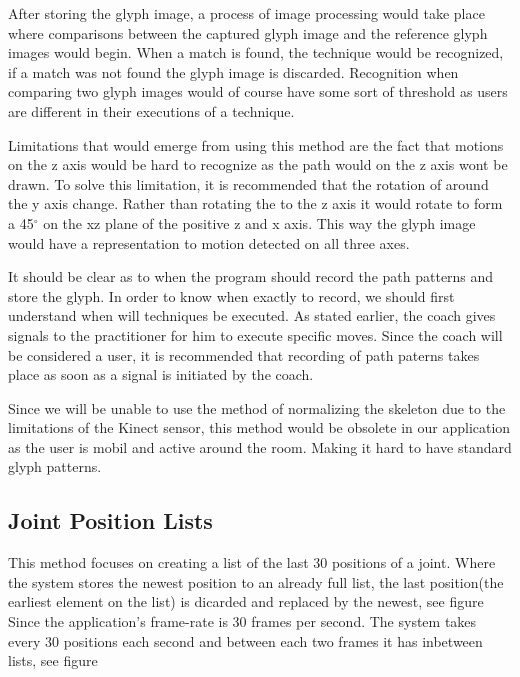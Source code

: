 
After storing the glyph image, a process of image processing would take place where comparisons between the captured glyph image and the reference glyph images would begin. When a match is found, the technique would be recognized, if a match was not found the glyph image is discarded. Recognition when comparing two glyph images would of course have some sort of threshold as users are different in their executions of a technique.

Limitations that would emerge from using this method are the fact that motions on the z axis would be hard to recognize as the path would on the z axis wont be drawn. To solve this limitation, it is recommended that the rotation of \N around the y axis change. Rather than rotating the \N to the z axis it would rotate to form a 45$^\circ$ on the xz plane of the positive z and x axis. This way the glyph image would have a representation to motion detected on all three axes.

It should be clear as to when the program should record the path patterns and store the glyph. In order to know when exactly to record, we should first understand when will techniques be executed. As stated earlier, the coach gives signals to the practitioner for him to execute specific moves. Since the coach will be considered a user, it is recommended that recording of path paterns takes place as soon as a signal is initiated by the coach.

Since we will be unable to use the method of normalizing the skeleton due to the limitations of the Kinect sensor, this method would be obsolete in our application as the user is mobil and active around the room. Making it hard to have standard glyph patterns.

\subsection{Joint Position Lists}
This method focuses on creating a list of the last 30 positions of a joint. Where the system stores the newest position to an already full list, the last position(the earliest element on the list) is dicarded and replaced by the newest, see figure %
Since the application's frame-rate is 30 frames per second. The system takes every 30 positions each second and between each two frames it has inbetween lists, see figure  %

